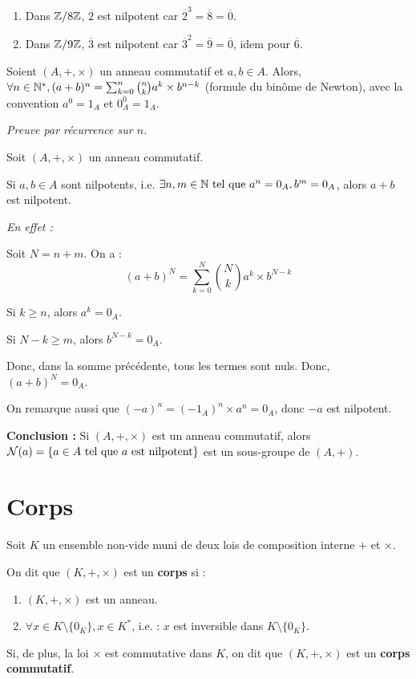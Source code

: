 \documentclass[12pt, a4paper]{report}
\begin{document}
\begin{example}
    \begin{enumerate}
        \item Dans $\mathbb{Z}/8\mathbb{Z}$, $\overline{2}$ est nilpotent car $\overline{2}^3 = \overline{8} = \overline{0}$.
        \item Dans $\mathbb{Z}/9\mathbb{Z}$, $\overline{3}$ est nilpotent car $\overline{3}^2 = \overline{9} = \overline{0}$, idem pour $\overline{6}$.
    \end{enumerate}
\end{example}

\begin{property}
    Soient $(A,+,\times)$ un anneau commutatif et $a,b\in A$. Alors, $\forall n \in \mathbb{N}^*, (a + b)^n = \sum_{k=0}^n \binom nk a^k \times b^{n-k}$ (formule du binôme de Newton), avec la convention $a^0 = 1_A$ et $0_A^0 = 1_A$.

    \textit{Preuve par récurrence sur $n$.}
\end{property}

\begin{application}
    Soit $(A,+,\times)$ un anneau commutatif.

    Si $a,b\in A$ sont nilpotents, i.e. $\exists n,m \in \mathbb{N} \text{ tel que } a^n = 0_A, b^m = 0_A$, alors $a + b$ est nilpotent.

    \textit{En effet :}

    Soit $N = n + m$. On a :
    $$(a + b)^N = \sum_{k=0}^N \binom Nk a^k \times b^{N-k}$$

    Si $k \ge n$, alors $a^k = 0_A$.

    Si $N - k \ge m$, alors $b^{N-k} = 0_A$.

    Donc, dans la somme précédente, tous les termes sont nuls. Donc, $(a + b)^N = 0_A$.

    On remarque aussi que $(-a)^n=(-1_A)^n \times a^n = 0_A$, donc $-a$ est nilpotent.

    \textbf{Conclusion : } Si $(A,+,\times)$ est un anneau commutatif, alors $\mathcal{N}(a) = \{a \in A \text{ tel que } a \text{ est nilpotent}\}$ est un sous-groupe de $(A,+)$.
\end{application}

\section{Corps}

\begin{definition}[Corps]
    Soit $K$ un ensemble non-vide muni de deux lois de composition interne $+$ et $\times$.
    
    On dit que $(K,+,\times)$ est un \textbf{corps} si :
    \begin{enumerate}
        \item $(K,+,\times)$ est un anneau.
        \item $\forall x \in K\setminus\{0_K\}, x \in K^*$, i.e. : $x$ est inversible dans $K\setminus\{0_K\}$.
    \end{enumerate}

    Si, de plus, la loi $\times$ est commutative dans $K$, on dit que $(K,+,\times)$ est un \textbf{corps commutatif}.
\end{definition}
\end{document}
